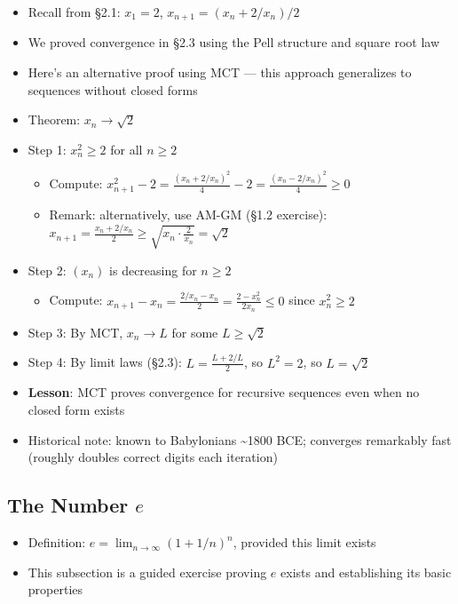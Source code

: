 \documentclass[
  10pt,
  letterpaper,
]{scrbook}
\providecommand{\tightlist}{%
  \setlength{\itemsep}{0pt}\setlength{\parskip}{0pt}}
\begin{document}
\begin{itemize}
\tightlist
\item
  Recall from §2.1: \(x_1 = 2\), \(x_{n+1} = (x_n + 2/x_n)/2\)
\item
  We proved convergence in §2.3 using the Pell structure and square root
  law
\item
  Here's an alternative proof using MCT --- this approach generalizes to
  sequences without closed forms
\item
  Theorem: \(x_n \to \sqrt{2}\)
\item
  Step 1: \(x_n^2 \geq 2\) for all \(n \geq 2\)

  \begin{itemize}
  \tightlist
  \item
    Compute:
    \(x_{n+1}^2 - 2 = \frac{(x_n + 2/x_n)^2}{4} - 2 = \frac{(x_n - 2/x_n)^2}{4} \geq 0\)
  \item
    Remark: alternatively, use AM-GM (§1.2 exercise):
    \(x_{n+1} = \frac{x_n + 2/x_n}{2} \geq \sqrt{x_n \cdot \frac{2}{x_n}} = \sqrt{2}\)
  \end{itemize}
\item
  Step 2: \((x_n)\) is decreasing for \(n \geq 2\)

  \begin{itemize}
  \tightlist
  \item
    Compute:
    \(x_{n+1} - x_n = \frac{2/x_n - x_n}{2} = \frac{2 - x_n^2}{2x_n} \leq 0\)
    since \(x_n^2 \geq 2\)
  \end{itemize}
\item
  Step 3: By MCT, \(x_n \to L\) for some \(L \geq \sqrt{2}\)
\item
  Step 4: By limit laws (§2.3): \(L = \frac{L + 2/L}{2}\), so
  \(L^2 = 2\), so \(L = \sqrt{2}\)
\item
  \textbf{Lesson}: MCT proves convergence for recursive sequences even
  when no closed form exists
\item
  Historical note: known to Babylonians \textasciitilde1800 BCE;
  converges remarkably fast (roughly doubles correct digits each
  iteration)
\end{itemize}

\subsection{\texorpdfstring{The Number
\(e\)}{The Number e}}\label{the-number-e}

\begin{itemize}
\tightlist
\item
  Definition: \(e = \lim_{n \to \infty}(1 + 1/n)^n\), provided this
  limit exists
\item
  This subsection is a guided exercise proving \(e\) exists and
  establishing its basic properties
\end{itemize}
\end{document}
